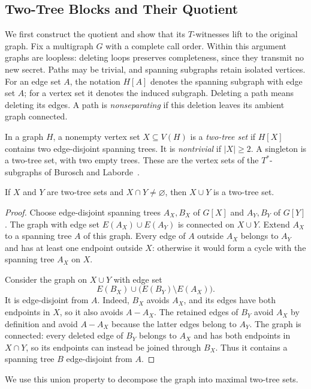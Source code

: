 \documentclass[USenglish, a4paper, thm-restate,numberwithinsect, cleveref]{lipics-v2021}
\begin{document}
\subsection{Two-Tree Blocks and Their Quotient}
\label{sec:necessity-blocks}
We first construct the quotient and show that its $T$-witnesses lift
to the original graph. Fix a multigraph $G$ with a complete call
order. Within this argument graphs are loopless: deleting loops
preserves completeness, since they transmit no new secret. Paths may
be trivial, and spanning subgraphs retain isolated vertices. For an
edge set $A$, the notation $H[A]$ denotes the spanning subgraph with
edge set $A$; for a vertex set it denotes the induced subgraph.
Deleting a path means deleting its edges. A path is \emph{nonseparating}
if this deletion leaves its ambient graph connected.

In a graph $H$, a nonempty vertex set $X\subseteq V(H)$ is a
\emph{two-tree set} if $H[X]$ contains two edge-disjoint spanning trees.
It is \emph{nontrivial} if $|X|\geq2$. A singleton is a two-tree set,
with two empty trees. These are the vertex sets of the $T^*$-subgraphs of
Burosch and Laborde~\cite{BuroschL92}.

\begin{lemma}\label{lem:characterization-union}
If $X$ and $Y$ are two-tree sets and $X\cap Y\neq\varnothing$, then
$X\cup Y$ is a two-tree set.
\end{lemma}
\begin{proof}
Choose edge-disjoint spanning trees $A_X,B_X$ of $G[X]$ and
$A_Y,B_Y$ of $G[Y]$. The graph with edge set $E(A_X)\cup E(A_Y)$
is connected on $X\cup Y$. Extend $A_X$ to a spanning tree $A$ of
this graph. Every edge of $A$ outside $A_X$ belongs to $A_Y$ and has
at least one endpoint outside $X$: otherwise it would form a cycle
with the spanning tree $A_X$ on $X$.

Consider the graph on $X\cup Y$ with edge set
\[
 E(B_X)\cup\bigl(E(B_Y)\setminus E(A_X)\bigr).
\]
It is edge-disjoint from $A$. Indeed, $B_X$ avoids $A_X$, and its
edges have both endpoints in $X$, so it also avoids $A-A_X$.
The retained edges of $B_Y$ avoid $A_X$ by definition and avoid
$A-A_X$ because the latter edges belong to $A_Y$.
The graph is connected: every deleted edge of $B_Y$ belongs to $A_X$
and has both endpoints in $X\cap Y$, so its endpoints can instead
be joined through $B_X$. Thus it contains a spanning tree $B$
edge-disjoint from $A$.
\end{proof}

We use this union property to decompose the graph into maximal
two-tree sets.
\end{document}
